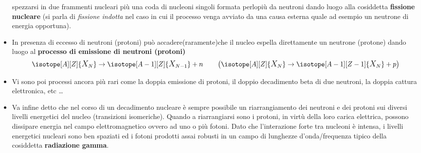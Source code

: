\begin{itemize}
    spezzarsi in due frammenti nucleari più una coda di nucleoni singoli formata perlopiù da neutroni dando luogo alla
    cosiddetta \textbf{fissione nucleare} (si parla di \emph{fissione indotta} nel caso in cui il processo venga avviato
    da una causa esterna quale ad esempio un neutrone di energia opportuna).
    \item  In presenza di eccesso di neutroni (protoni) può accadere(raramente)che il nucleo espella direttamente un
    neutrone (protone) dando luogo al \textbf{processo di emissione di neutroni (protoni)}
    \[
       \isotope[A][Z]{\mathlarger{X}_{N}} \to \isotope[A-1][Z]{\mathlarger{X}_{N-1}} + n \qquad
      \left(    \isotope[A][Z]{\mathlarger{X}_{N}} \to \isotope[A-1][Z-1]{\mathlarger{X}_{N}} + p    \right)
    \]
    \item Vi sono poi processi ancora più rari come la doppia emissione di protoni, il doppio decadimento beta
    di due neutroni, la doppia cattura elettronica, etc \ldots
    \item Va infine detto che nel corso di un decadimento nucleare è sempre possibile un riarrangiamento dei neutroni
    e dei protoni sui diversi livelli energetici del nucleo (transizioni isomeriche).
    Quando a riarrangiarsi sono i protoni, in virtù della loro carica elettrica, possono dissipare energia nel campo
    elettromagnetico ovvero ad uno o più fotoni.
    Dato che l’interazione forte tra nucleoni è intensa, i livelli energetici nucleari sono ben spaziati ed i fotoni
    prodotti assai robusti in un campo di lunghezze d’onda/frequenza tipico della cosiddetta \textbf{radiazione gamma}.
\end{itemize}

